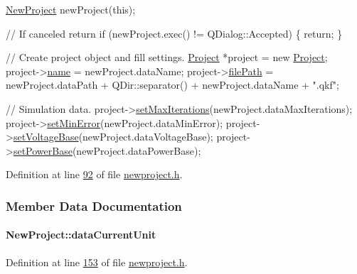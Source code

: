 \begin{DoxyCode}
\hyperlink{class_new_project}{NewProject} newProject(\textcolor{keyword}{this});

\textcolor{comment}{// If canceled return}
\textcolor{keywordflow}{if} (newProject.exec() != QDialog::Accepted) \{
  \textcolor{keywordflow}{return};
\}

\textcolor{comment}{// Create project object and fill settings.}
\hyperlink{class_project}{Project} *project = \textcolor{keyword}{new} \hyperlink{class_project}{Project};
project->\hyperlink{class_project_a82dd2d1bc38f9fd08c9a811fcaa76b38}{name} = newProject.dataName;
project->\hyperlink{class_project_a79f30adcefd0b72bd4ac7db724bc9531}{filePath} = newProject.dataPath + QDir::separator() +
                    newProject.dataName + \textcolor{stringliteral}{".qkf"};

\textcolor{comment}{// Simulation data.}
project->\hyperlink{class_project_abac6e194d2d16fbdbe51627844eae60b}{setMaxIterations}(newProject.dataMaxIterations);
project->\hyperlink{class_project_a2cb776c39adb42a1113bf7887d0d4636}{setMinError}(newProject.dataMinError);
project->\hyperlink{class_project_a494c3e89851f754188c7abaedbf77ef6}{setVoltageBase}(newProject.dataVoltageBase);
project->\hyperlink{class_project_abb4df805b3cd3af509a41e657eb4bb83}{setPowerBase}(newProject.dataPowerBase);
\end{DoxyCode}
 

Definition at line \hyperlink{newproject_8h_source_l00092}{92} of file \hyperlink{newproject_8h_source}{newproject.\+h}.



\subsubsection{Member Data Documentation}
\hypertarget{class_new_project_a9d389065ff7f8588338069018088a20f}{}
\paragraph[{data\+Current\+Unit}]{ New\+Project\+::data\+Current\+Unit}\label{class_new_project_a9d389065ff7f8588338069018088a20f}


Definition at line \hyperlink{newproject_8h_source_l00153}{153} of file \hyperlink{newproject_8h_source}{newproject.\+h}.

